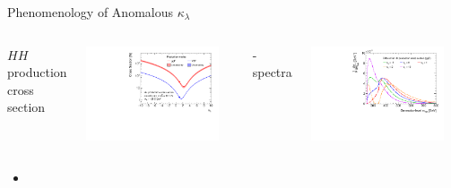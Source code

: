 \documentclass[11pt, xcolor={dvipsnames}, aspectratio=169]{beamer}
\begin{document}

\begin{frame}{Phenomenology of Anomalous $\kappa_{\lambda}$}
  \begin{columns}
    \centering

    $HH$ production cross section

    \includegraphics[width=0.9\textwidth]{self_coupling/hh_xsec}

    \centering

    \mHH-spectra

    \includegraphics[width=0.9\textwidth]{self_coupling/hh_mhh_vs_klam}
  \end{columns}

  \begin{itemize}
  \item
  \end{itemize}
\end{frame}
\end{document}
